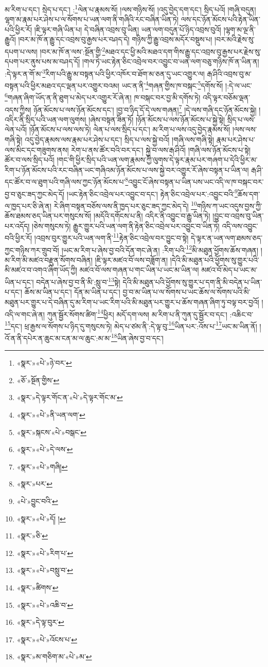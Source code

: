 མ་རིག་པ་དང་། སྲེད་པ་དང་། :\footnote{«སྣར་»«པེ་»ཉེ་བར་}ལེན་པ་རྣམས་སོ། །ལས་གཉིས་སོ། །འདུ་བྱེད་དག་དང་། སྲིད་པའོ། །གཞི་བདུན། ལྷག་མ་རྣམ་པར་ཤེས་པ་ལ་སོགས་པ་ཡན་ལག་ནི་གཞིའི་རང་བཞིན་ཡིན་ཏེ། ལས་དང་ཉོན་མོངས་པའི་རྟེན་ཡིན་པའི་ཕྱིར་རོ། །ཇི་ལྟར་གཞི་ཡིན་པ། དེ་བཞིན་འབྲས་བུ་ཡིན། ཡན་ལག་བདུན་པོ་ཉིད་འབྲས་བུའོ། །ལྷག་མ་ལྔ་ནི་རྒྱུའོ། །བར་མ་ཁོ་ན་རྒྱུ་དང་འབྲས་བུ་རྒྱས་པར་བཤད་དེ། གཉིས་ཀྱི་རྒྱུ་འབྲས་མདོར་བསྡུས་པ། །བར་མའི་རྗེས་སུ་དཔག་པ་ལས། །བར་མ་ཁོ་ན་ལས་:སྔོན་གྱི་\footnote{«ཅོ་»སྔོན་གྱིས་}མཐའ་དང་ཕྱི་མའི་མཐའ་དག་གིས་རྒྱུ་དང་འབྲས་བུ་རྒྱས་པར་རྗེས་སུ་དཔག་པར་ནུས་པས་མ་བཤད་དོ། །གལ་ཏེ་ཡང་རྟེན་ཅིང་འབྲེལ་བར་འབྱུང་བ་ཡན་ལག་བཅུ་གཉིས་ཁོ་ན་ཡིན་ན། :དེ་ལྟར་ན་གོ་མ་\footnote{«སྣར་»དེ་ལྟར་གོང་ན་«པེ་»དེ་ལྟར་གོང་མ་}རིག་པའི་རྒྱུ་མ་བསྟན་པའི་ཕྱིར་འཁོར་བ་ཐོག་མ་ཅན་དུ་ཡང་འགྱུར་ལ། རྒ་ཤིའི་འབྲས་བུ་མ་བསྟན་པའི་ཕྱིར་མཐའ་དང་ལྡན་པར་འགྱུར་བའམ། ཡང་ན་ནི་\footnote{«སྣར་»«པེ་»ནི་ཡན་ལག་}གཞན་གྱིས་ཁ་བསྐང་\footnote{«སྣར་»སྐངས་«པེ་»བསྒང་}དགོས་སོ། །:དེ་ལ་ཡང་\footnote{«སྣར་»«པེ་»དེ་ལས་}གཞན་ཞིག་ཡོད་ན་ནི་ཐུག་པ་མེད་པར་འགྱུར་རོ་ཞེ་ན། ཁ་བསྐང་བར་བྱ་མི་དགོས་ཏེ། འདི་ལྟར་བཅོམ་ལྡན་འདས་ཀྱིས། ཉོན་མོངས་པ་ལས་ཉོན་མོངས་དང་། །བྱ་བ་ཉིད་དོ་དེ་ལས་གཞན།\footnote{«སྣར་»«པེ་»གཞི།} །དེ་ལས་གཞི་དང་ཉོན་མོངས་སྐྱེ། །འདིར་ནི་སྲིད་པའི་ཡན་ལག་ལུགས། །ཞེས་བསྟན་ཟིན་ཏོ། །ཉོན་མོངས་པ་ལས་ཉོན་མོངས་པ་སྐྱེ་སྟེ། སྲིད་པ་ལས་ལེན་པའོ། །ཉོན་མོངས་པ་ལས་ལས་ཏེ། ལེན་པ་ལས་སྲིད་པ་དང་། མ་རིག་པ་ལས་འདུ་བྱེད་རྣམས་སོ། །ལས་ལས་གཞི་སྟེ། འདུ་བྱེད་རྣམས་ལས་རྣམ་པར་ཤེས་པ་དང་། སྲིད་པ་ལས་སྐྱེ་བའོ། །གཞི་ལས་གཞི་སྟེ། རྣམ་པར་ཤེས་པ་ལས་མིང་དང་གཟུགས་ནས། རེག་པ་ནས་ཚོར་བའི་བར་དང་། སྐྱེ་བ་ལས་རྒ་ཤིའོ། །གཞི་ལས་ཉོན་མོངས་པ་སྟེ། ཚོར་བ་ལས་སྲིད་པའོ། །གང་གི་ཕྱིར་སྲིད་པའི་ཡན་ལག་རྣམས་ཀྱི་ལུགས་དེ་ལྟར་རྣམ་པར་གཞག་པ་དེའི་ཕྱིར་མ་རིག་པ་ཉོན་མོངས་པའི་རང་བཞིན་ཡང་གཞིའམ་ཉོན་མོངས་པ་ལས་སྐྱེ་བར་འགྱུར་རོ་ཞེས་བསྟན་པ་ཡིན་ལ། རྒ་ཤི་དང་ཚོར་བ་ལ་ཐུག་པའི་གཞི་ལས་ཀྱང་ཉོན་མོངས་པ་\footnote{«སྣར་»པར་}འབྱུང་ངོ་ཞེས་བསྟན་པ་ཡིན་པས་ཡང་འདི་ལ་ཁ་བསྐང་བར་བྱ་བ་ཅུང་ཟད་ཀྱང་མེད་དོ། །ཡང་རྟེན་ཅིང་འབྲེལ་པར་འབྱུང་བ་དང་། རྟེན་ཅིང་འབྲེལ་པར་:འབྱུང་བའི་\footnote{«པེ་»བྱུང་བའི་}ཆོས་དག་ལ་ཁྱད་པར་ཅི་ཞེ་ན། རེ་ཞིག་བསྟན་བཅོས་ལས་ནི་ཁྱད་པར་ཅུང་ཟད་ཀྱང་མེད་དེ། \footnote{«སྣར་»«པེ་»དོ། ། }གཉིས་ཀ་ཡང་འདུས་བྱས་ཀྱི་ཆོས་ཐམས་ཅད་ཡིན་པར་གསུངས་སོ། །མདོའི་དགོངས་པ་ནི། འདིར་ནི་འབྱུང་བ་རྒྱུ་ཡིན་ཏེ། །བྱུང་བ་འབྲས་བུ་ཡིན་པར་འདོད། །ཅེས་གསུངས་ཏེ། རྒྱུར་གྱུར་པའི་ཡན་ལག་ནི་རྟེན་ཅིང་འབྲེལ་པར་འབྱུང་བ་ཡིན་ཏེ། འདི་ལས་འབྱུང་བའི་ཕྱིར་རོ། །འབྲས་བུར་གྱུར་པའི་ཡན་ལག་ནི་\footnote{«སྣར་»ཅི་}རྟེན་ཅིང་འབྲེལ་བར་བྱུང་བ་སྟེ། དེ་ལྟར་ན་ཡན་ལག་ཐམས་ཅད་ཀྱང་གཉིས་ཀར་གྲུབ་བོ། །ཡང་མ་རིག་པ་ཞེས་བྱ་བའི་དོན་གང་ཞེ་ན། :རིག་པའི་\footnote{«སྣར་»«པེ་»རིག་པ་}མི་མཐུན་ཕྱོགས་ཆོས་གཞན། །མ་རིག་མི་མཛའ་བརྫུན་སོགས་བཞིན། །ཇི་ལྟར་མཛའ་བོ་ལས་བཟློག་ན། །དེའི་མི་མཐུན་པའི་ཕྱོགས་སུ་གྱུར་པའི་མི་མཛའ་བ་འགའ་ཞིག་ཡོད་ཀྱི། མཛའ་བོ་ལས་གཞན་པ་གང་ཡིན་པ་ཡང་མ་ཡིན་ལ། མཛའ་བོ་མེད་པ་ཡང་མ་ཡིན་པ་དང་། བདེན་པ་ཞེས་བྱ་བ་ནི་མི་:སླུ་བ་\footnote{«སྣར་»«པེ་»བསླུ་བ་}སྟེ། དེའི་མི་མཐུན་པའི་ཕྱོགས་སུ་གྱུར་པ་དག་ནི་མི་བདེན་པ་ཡིན་པ་དང་། ཆོས་མ་ཡིན་པ་དང་། དོན་མ་ཡིན་པ་དང་། བྱ་བ་མ་ཡིན་པ་ལ་སོགས་པ་ཡང་ཆོས་ལ་སོགས་པའི་མི་མཐུན་པར་གྱུར་པ་དེ་བཞིན་དུ་མ་རིག་པ་ཡང་རིག་པའི་མི་མཐུན་པར་གྱུར་པ་ཆོས་གཞན་ཞིག་ཏུ་བལྟ་བར་བྱའོ། །འདི་ལ་གང་ཞེ་ན། ཀུན་སྦྱོར་སོགས་ཚིག་\footnote{«སྣར་»ཚིགས་}ཕྱིར། མདོ་དག་ལས། མ་རིག་པ་ནི་ཀུན་དུ་སྦྱོར་བ་དང་། :འཆིང་བ་\footnote{«སྣར་»«པེ་»འཆི་བ་}དང་། ཕྲ་རྒྱས་ལ་སོགས་པ་ཉིད་དུ་གསུངས་ཏེ། མེད་པ་ཙམ་ནི་:དེ་ལྟ་བུ་\footnote{«སྣར་»དེ་ལྟ་བུར་}ཡིན་པར་:འོས་པ་\footnote{«སྣར་»«པེ་»འོངས་པ་}ཡང་མ་ཡིན་ནོ། །འོ་ན་ནི་དཔེར་ན་ཆུང་མ་ངན་མ་ལ་ཆུང་:མ་མ་\footnote{«སྣར་»མ་གཅིག་མ་«པེ་»མ་}ཡིན་ཞེས་བྱ་བ་དང་། 